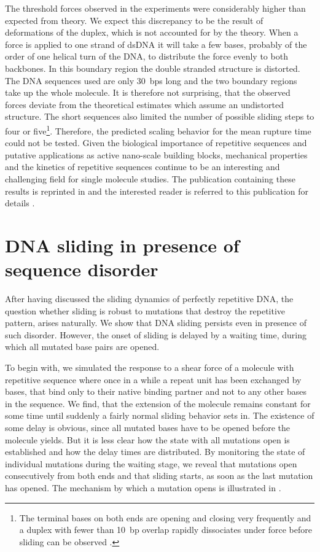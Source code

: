 The threshold forces observed in the experiments were considerably higher than expected
from theory. We expect this discrepancy to be the result of deformations of the duplex, which is
not accounted for by the theory. When a force is applied to one strand of dsDNA it will
take a few bases, probably of the order of one helical turn of the DNA, to distribute the force
evenly to both backbones. In this boundary region the double stranded structure is distorted. The
DNA sequences used are only 30~bps long and the two boundary regions take up the whole molecule. 
It is therefore not surprising, that the observed forces deviate from the theoretical estimates which
assume an undistorted structure. The short sequences also limited the number of possible
sliding steps to four or five\footnote{The terminal bases on both ends are opening and closing
very frequently and a duplex with fewer than 10~bp overlap rapidly dissociates under force before sliding
can be observed \cite{Strunz_PNAS_99}.}. Therefore, the predicted scaling behavior for the mean
rupture time could not be tested. Given the biological importance of repetitive sequences and 
putative applications as active nano-scale building blocks, mechanical properties and the 
kinetics of repetitive sequences continue to be an interesting and challenging field for 
single molecule studies. 
The publication containing these results is reprinted in 
and the interested reader is referred to this publication for details \cite{Kuehner_BiophysJ_07}. 


\section{\label{sec:sliding_disorder}DNA sliding in presence of sequence disorder}
After having discussed the sliding dynamics of perfectly repetitive DNA, the question whether
sliding is robust to mutations that destroy the repetitive pattern, arises naturally. We show that
DNA sliding persists even in presence of such disorder. However, the onset of sliding is delayed by a 
waiting time, during which all mutated base pairs are opened. 
 
To begin with, we simulated the response to a shear force of a molecule with repetitive 
sequence where once in a while a repeat unit has been exchanged by bases, that bind only to 
their native binding partner and not to any other bases in the sequence. We find, that 
the extension of the molecule remains constant for some time until suddenly a fairly normal 
sliding behavior sets in. The existence of some delay is obvious, since all mutated bases have to be opened before the molecule 
yields. But it is less clear how the state with all mutations open is established and how the delay
times are distributed. 
By monitoring the state of individual mutations during the waiting stage, we reveal that 
mutations open consecutively from both ends and that sliding starts, as soon as the last 
mutation has opened. The mechanism by which a mutation opens 
is illustrated in  .


